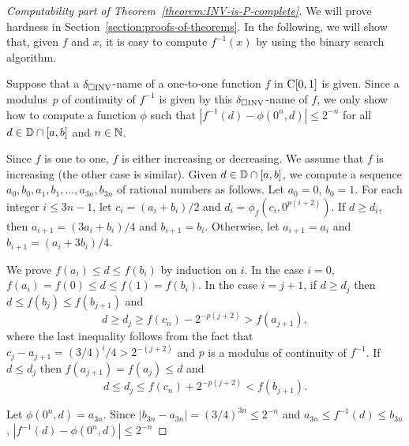 \documentclass[envcountsect,envcountsame,orivec,oribibl]{llncs}
\begin{document}
\begin{proof}[Computability part of Theorem~\ref{theorem:INV-is-P-complete}]
We will prove hardness in Section~\ref{section:proofs-of-theorems}.
In the following, we will show that, 
given $f$ and $x$, 
it is easy to compute $f^{-1}(x)$ by using the binary search algorithm.

Suppose that a $\delta _{\square \mathrm{INV}}$-name of a one-to-one function $f$ in $\mathrm C [0, 1]$ is given. 
Since a modulus~$p$ of continuity of $f ^{-1}$ is given by this $\delta _{\square \mathrm{INV}}$-name of $f$,
we only show how to compute a function $\phi$ such that 
$|f^{-1}(d) - \phi(0^n, d)| \le 2^{-n}$ for all $d \in \mathbb D \cap [a, b]$ and $n \in \mathbb N$.

Since $f$ is one to one, $f$ is either increasing or decreasing. 
We assume that $f$ is increasing (the other case is similar).
Given $d \in \mathbb D \cap [a, b]$, 
we compute a sequence  $a_0, b_0, a_1,b_1, \dots, a_{3n}, b_{3n}$ of rational numbers as follows.
Let $a_0 = 0$, $b_0 = 1$.
For each integer $i \le 3n-1$,
let $c_i = (a_i+b_i)/2$ and $d_i = \phi_f(c_i, 0^{p(i+2)})$.
If $d \ge d_i$, then $a_{i+1} = (3a_i+b_i)/4$ and $b_{i+1} = b_i$. 
Otherwise, let $a_{i+1} = a_i$ and $b_{i+1} = (a_i+3b_i)/4$.

We prove $f(a_i) \leq d \leq f(b_i)$ by induction on $i$.
In the case $i = 0$, $f(a_i) = f(0) \le d \le f(1) = f(b_i)$.
In the case $i=j+1$, if $d \ge d_j$ then $d \le f(b_j) \le f(b_{j+1})$ and
\begin{equation}
 d \ge d_j \ge f(c_n) - 2^{-p(j+2)} > f(a_{j+1}),
\end{equation}
where the last inequality follows from the fact that $c_j - a_{j+1} = (3/4)^i/4 > 2^{-(j+2)}$ and $p$ is a modulus of continuity of $f^{-1}$.
If $d \le d_j$ then $f(a_{j+1}) = f(a_j) \le d$ and 
\begin{equation}
 d \le d_j \le f(c_n) + 2^{-p(j+2)} < f(b_{j+1}).
\end{equation}

Let $\phi(0^n, d) = a_{3n}$.
Since $|b_{3n} - a_{3n}| = (3/4)^{3n} \le 2^{-n}$ and
$a_{3n} \le f^{-1}(d) \le b_{3n}$,
$|f^{-1}(d) - \phi(0^n, d)| \le 2^{-n}$
\end{proof}
\end{document}
